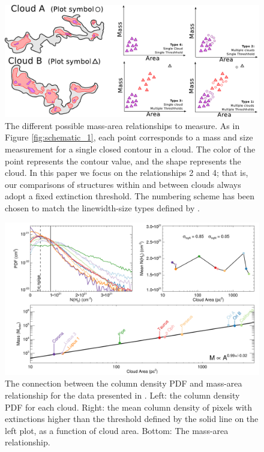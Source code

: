 \begin{figure}
\includegraphics[width=6in]{clouds_2_c}
\caption{The different possible mass-area relationships to measure. As in Figure \ref{fig:schematic_1}, each point corresponds to a mass and size measurement for a single closed contour in a cloud. The color of the point represents the contour value, and the shape represents the cloud. In this paper we focus on the relationships 2 and 4; that is, our comparisons of structures within and between clouds always adopt a fixed extinction threshold. The numbering scheme has been chosen to match the linewidth-size types defined by \cite{Goodman98}.}
\label{fig:schematic_2}
\end{figure}

\begin{figure}
\includegraphics[width=6in]{mr_data}
\caption{The connection between the column density PDF and mass-area relationship for the data presented in \cite{Lombardi10}. Left: the column density PDF for each cloud. Right: the mean column density of pixels with extinctions higher than the threshold defined by the solid line on the left plot, as a function of cloud area. Bottom: The mass-area relationship.}
\label{fig:mr_data}
\end{figure}


